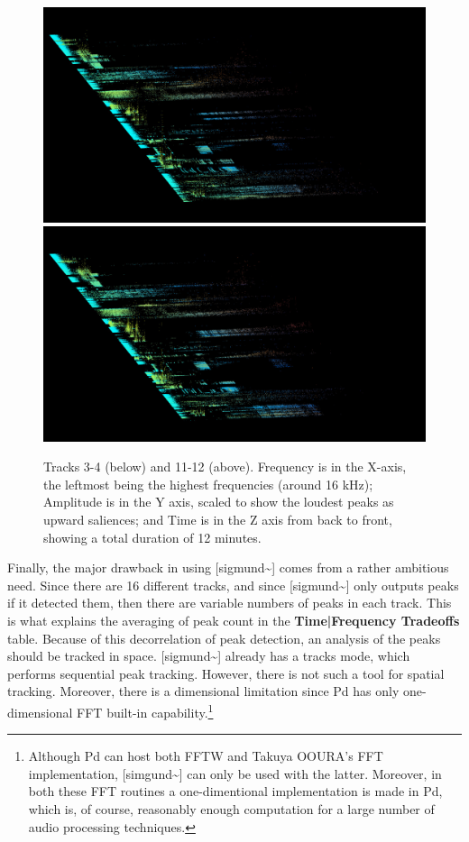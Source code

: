 \documentclass{article}
\begin{document}
\begin{figure}
\begin{multicols}{2}
    \includegraphics[width=\linewidth]{preset-50-3.jpg}%
    \includegraphics[width=\linewidth]{preset-50-4.jpg}%
\end{multicols}
    
\caption{Tracks 3-4 (below) and 11-12 (above). Frequency is in the X-axis, the leftmost being the highest frequencies (around 16 kHz); Amplitude is in the Y axis, scaled to show the loudest peaks as upward saliences; and Time is in the Z axis from back to front, showing a total duration of 12 minutes.}
\end{figure}


Finally, the major drawback in using [sigmund\~{}] comes from a rather ambitious need. Since there are 16 different tracks, and since [sigmund\~{}] only outputs peaks if it detected them, then there are variable numbers of peaks in each track. This is what explains the averaging of peak count in the \textbf{Time|Frequency Tradeoffs} table. Because of this decorrelation of peak detection, an analysis of the peaks should be tracked in space. [sigmund\~{}] already has a tracks mode, which performs sequential peak tracking. However, there is not such a tool for spatial tracking. Moreover, there is a dimensional limitation since Pd has only one-dimensional FFT built-in capability.\footnote{Although Pd can host both FFTW and Takuya OOURA's FFT implementation, [simgund\~{}] can only be used with the latter. Moreover, in both these FFT routines a one-dimentional implementation is made in Pd, which is, of course, reasonably enough computation for a large number of audio processing techniques.} 
\end{document}
